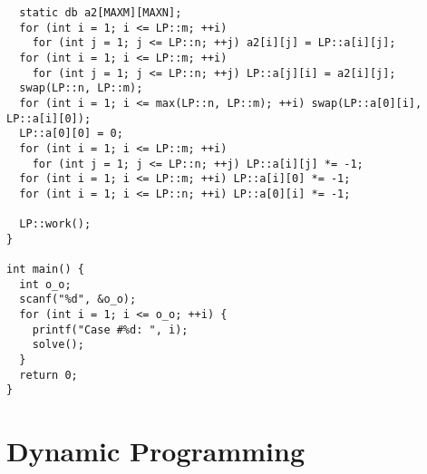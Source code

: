 \documentclass[twoside]{article}
\begin{document}
\begin{lstlisting}
  static db a2[MAXM][MAXN];
  for (int i = 1; i <= LP::m; ++i)
    for (int j = 1; j <= LP::n; ++j) a2[i][j] = LP::a[i][j];
  for (int i = 1; i <= LP::m; ++i)
    for (int j = 1; j <= LP::n; ++j) LP::a[j][i] = a2[i][j];
  swap(LP::n, LP::m);
  for (int i = 1; i <= max(LP::n, LP::m); ++i) swap(LP::a[0][i], LP::a[i][0]);
  LP::a[0][0] = 0;
  for (int i = 1; i <= LP::m; ++i)
    for (int j = 1; j <= LP::n; ++j) LP::a[i][j] *= -1;
  for (int i = 1; i <= LP::m; ++i) LP::a[i][0] *= -1;
  for (int i = 1; i <= LP::n; ++i) LP::a[0][i] *= -1;

  LP::work();
}

int main() {
  int o_o;
  scanf("%d", &o_o);
  for (int i = 1; i <= o_o; ++i) {
    printf("Case #%d: ", i);
    solve();
  }
  return 0;
}

\end{lstlisting}

\section{Dynamic Programming}
\end{document}
